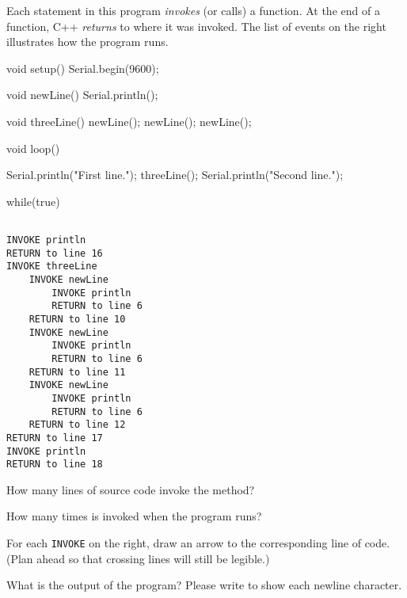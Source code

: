 
Each statement in this program \emph{invokes} (or calls) a function.
At the end of a function, C++ \emph{returns} to where it was invoked.
The list of events on the right illustrates how the program runs.

\vspace{3ex}

\begin{minipage}{0.68\textwidth}
\begin{javabox}
void setup() {
    Serial.begin(9600);
}

void newLine() {
    Serial.println();
}

void threeLine() {
    newLine();
    newLine();
    newLine();
}

void loop() {
    Serial.println("First line.");
    threeLine();
    Serial.println("Second line.");

    while(true) {
    }
}
\end{javabox}
\end{minipage}
\hfill
\begin{minipage}{0.34\textwidth}
\begin{verbatim}

INVOKE println
RETURN to line 16
INVOKE threeLine
    INVOKE newLine
        INVOKE println
        RETURN to line 6
    RETURN to line 10
    INVOKE newLine
        INVOKE println
        RETURN to line 6
    RETURN to line 11
    INVOKE newLine
        INVOKE println
        RETURN to line 6
    RETURN to line 12
RETURN to line 17
INVOKE println
RETURN to line 18

\end{verbatim}
\end{minipage}



\Q \label{lines}
How many lines of source code invoke the  method? 
\vspace{1em}


\Q \label{times}
How many times is  invoked when the program runs? 
\vspace{1em}

\Q For each \texttt{INVOKE} on the right, draw an arrow to the corresponding line of code.
(Plan ahead so that crossing lines will still be legible.) 
\vspace{1em}


\Q What is the output of the program? Please write \java{\\n} to show each newline character.

